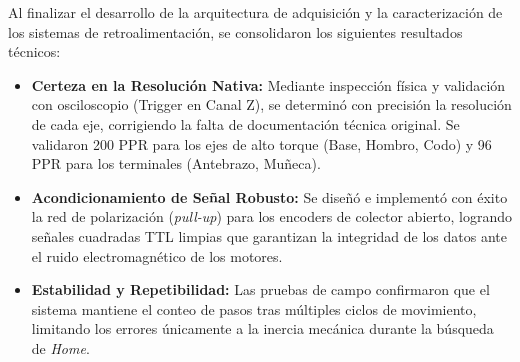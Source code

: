 \begin{resultadosFase}
	Al finalizar el desarrollo de la arquitectura de adquisición y la caracterización de los sistemas de retroalimentación, se consolidaron los siguientes resultados técnicos:
	
	\begin{itemize}
		\item \textbf{Certeza en la Resolución Nativa:} Mediante inspección física y validación con osciloscopio (Trigger en Canal Z), se determinó con precisión la resolución de cada eje, corrigiendo la falta de documentación técnica original. Se validaron 200 PPR para los ejes de alto torque (Base, Hombro, Codo) y 96 PPR para los terminales (Antebrazo, Muñeca).
		
		\item \textbf{Acondicionamiento de Señal Robusto:} Se diseñó e implementó con éxito la red de polarización (\textit{pull-up}) para los encoders de colector abierto, logrando señales cuadradas TTL limpias que garantizan la integridad de los datos ante el ruido electromagnético de los motores.
		
		\item \textbf{Estabilidad y Repetibilidad:} Las pruebas de campo confirmaron que el sistema mantiene el conteo de pasos tras múltiples ciclos de movimiento, limitando los errores únicamente a la inercia mecánica durante la búsqueda de \textit{Home}.
	\end{itemize}
\end{resultadosFase}